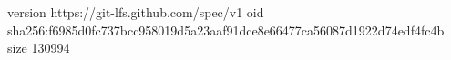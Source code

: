 version https://git-lfs.github.com/spec/v1
oid sha256:f6985d0fc737bcc958019d5a23aaf91dce8e66477ca56087d1922d74edf4fc4b
size 130994
